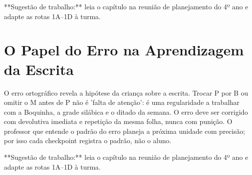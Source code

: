 \begin{dica}
**Sugestão de trabalho:** leia o capítulo na reunião de planejamento do 4º ano e adapte as rotas 1A–1D à turma.
\end{dica}

\chapter{O Papel do Erro na Aprendizagem da Escrita}

O erro ortográfico revela a hipótese da criança sobre a escrita. Trocar P por B ou omitir o M antes de P não é 'falta de atenção': é uma regularidade a trabalhar com a Boquinha, a grade silábica e o ditado da semana. O erro deve ser corrigido com devolutiva imediata e repetição da mesma folha, nunca com punição. O professor que entende o padrão do erro planeja a próxima unidade com precisão; por isso cada checkpoint registra o padrão, não o aluno.


\begin{dica}
**Sugestão de trabalho:** leia o capítulo na reunião de planejamento do 4º ano e adapte as rotas 1A–1D à turma.
\end{dica}
